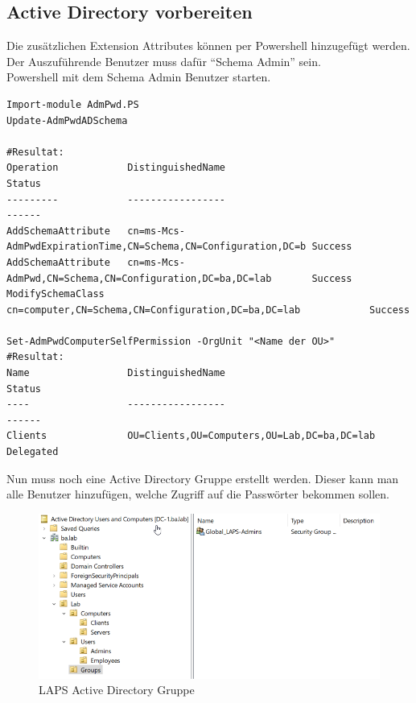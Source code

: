 \subsection{Active Directory vorbereiten}
Die zusätzlichen Extension Attributes können per Powershell hinzugefügt werden.
Der Auszuführende Benutzer muss dafür ``Schema Admin'' sein.\\

Powershell mit dem Schema Admin Benutzer starten.
\begin{lstlisting}
Import-module AdmPwd.PS
Update-AdmPwdADSchema

#Resultat:
Operation            DistinguishedName                                              Status
---------            -----------------                                              ------
AddSchemaAttribute   cn=ms-Mcs-AdmPwdExpirationTime,CN=Schema,CN=Configuration,DC=b Success
AddSchemaAttribute   cn=ms-Mcs-AdmPwd,CN=Schema,CN=Configuration,DC=ba,DC=lab       Success
ModifySchemaClass    cn=computer,CN=Schema,CN=Configuration,DC=ba,DC=lab            Success

Set-AdmPwdComputerSelfPermission -OrgUnit "<Name der OU>"
#Resultat:
Name                 DistinguishedName                                              Status
----                 -----------------                                              ------
Clients              OU=Clients,OU=Computers,OU=Lab,DC=ba,DC=lab                    Delegated
\end{lstlisting}

Nun muss noch eine Active Directory Gruppe erstellt werden.
Dieser kann man alle Benutzer hinzufügen, welche Zugriff auf die Passwörter bekommen sollen.

\begin{figure}[H]
    \centering
    \includegraphics[width=0.7\linewidth]{../img/LAPS/Laps-Admins.png}
    \caption{LAPS Active Directory Gruppe}
\end{figure}

